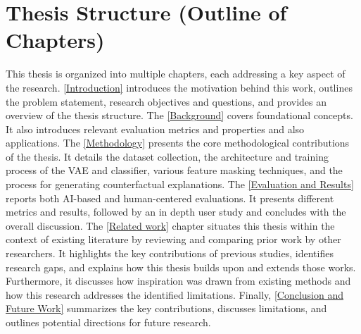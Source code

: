 \section{Thesis Structure (Outline of Chapters)}
This thesis is organized into multiple chapters, each addressing a key aspect of the research. \autoref{Introduction} introduces the motivation behind this work, outlines the problem statement, research objectives and questions, and provides an overview of the thesis structure. The
\autoref{Background} covers foundational concepts. It also introduces relevant evaluation metrics and properties and also applications.
The \autoref{Methodology} presents the core methodological contributions of the thesis. It details the dataset collection, the architecture and training process of the VAE and classifier, various feature masking techniques, and the process for generating counterfactual explanations. The \autoref{Evaluation and Results} reports both AI-based and human-centered evaluations. It presents different metrics and results, followed by an in depth user study and concludes with the overall discussion. The \autoref{Related work} chapter situates this thesis within the context of existing literature by reviewing and comparing prior work by other researchers. It highlights the key contributions of previous studies, identifies research gaps, and explains how this thesis builds upon and extends those works. Furthermore, it discusses how inspiration was drawn from existing methods and how this research addresses the identified limitations. Finally, \autoref{Conclusion and Future Work} summarizes the key contributions, discusses limitations, and outlines potential directions for future research.
